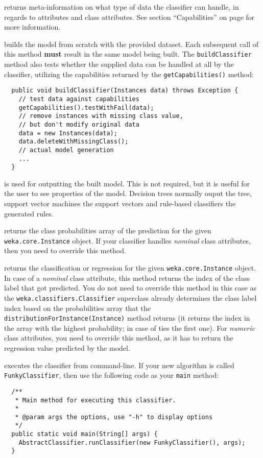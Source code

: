 returns meta-information on what type of data the classifier can handle, in
regards to attributes and class attributes. See section ``Capabilities'' on page
\pageref{classifier_capabilities} for more information.

\clearpage

builds the model from scratch with the provided dataset. Each subsequent call of
this method \textbf{must} result in the same model being built. The
\texttt{buildClassifier} method also tests whether the supplied data can be
handled at all by the classifier, utilizing the capabilities returned by the
\texttt{getCapabilities()} method:
\begin{verbatim}
  public void buildClassifier(Instances data) throws Exception {
    // test data against capabilities
    getCapabilities().testWithFail(data);
    // remove instances with missing class value,
    // but don't modify original data
    data = new Instances(data);
    data.deleteWithMissingClass();
    // actual model generation
    ...
  }
\end{verbatim}

is used for outputting the built model. This is not required, but it is useful
for the user to see properties of the model. Decision trees normally ouput the
tree, support vector machines the support vectors and rule-based classifiers the
generated rules.

returns the class probabilities array of the prediction for the given
\texttt{weka.core.Instance} object. If your classifier handles \textit{nominal}
class attributes, then you need to override this method.

returns the classification or regression for the given
\texttt{weka.core.Instance} object. In case of a \textit{nominal} class
attribute, this method returns the index of the class label that got predicted.
You do not need to override this method in this case as the
\texttt{weka.classifiers.Classifier} superclass already determines the class
label index based on the probabilities array that the
\texttt{distributionForInstance(Instance)} method returns (it returns the index
in the array with the highest probability; in case of ties the first one). For
\textit{numeric} class attributes, you need to override this method, as it has
to return the regression value predicted by the model.

executes the classifier from command-line. If your new algorithm is called
\texttt{FunkyClassifier}, then use the following code as your \texttt{main}
method:
\begin{verbatim}
  /**
   * Main method for executing this classifier.
   *
   * @param args the options, use "-h" to display options
   */
  public static void main(String[] args) {
    AbstractClassifier.runClassifier(new FunkyClassifier(), args);
  }
\end{verbatim}

